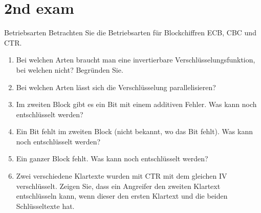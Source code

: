\documentclass{article}
\begin{document}
%



\setcounter{section}{2022}
\section{2nd exam}

\begin{exercise}{Betriebsarten}
  Betrachten Sie die Betriebsarten für Blockchiffren ECB, CBC und CTR.

  \begin{enumerate}
    \item Bei welchen Arten braucht man eine invertierbare Verschlüsselungsfunktion, bei welchen nicht? Begründen Sie.
    \item Bei welchen Arten lässt sich die Verschlüsselung parallelisieren?
    \item Im zweiten Block gibt es ein Bit mit einem additiven Fehler. Was kann noch entschlüsselt werden?
    \item Ein Bit fehlt im zweiten Block (nicht bekannt, wo das Bit fehlt). Was kann noch entschlüsselt werden?
    \item Ein ganzer Block fehlt. Was kann noch entschlüsselt werden?
    \item Zwei verschiedene Klartexte wurden mit CTR mit dem gleichen IV verschlüsselt. Zeigen Sie, dass ein Angreifer den zweiten Klartext entschlüsseln kann, wenn dieser den ersten Klartext und die beiden Schlüsseltexte hat.
  \end{enumerate}


\end{exercise}
\end{document}
